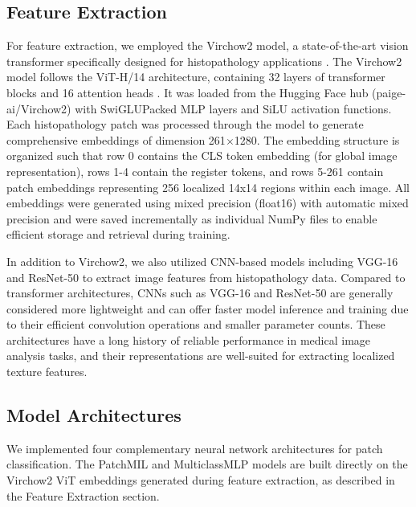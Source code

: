\documentclass[a4paper,12pt]{article}
\begin{document}
\subsection{Feature Extraction}
For feature extraction, we employed the Virchow2 model, a state-of-the-art vision transformer specifically designed for histopathology applications \cite{vorontsov_virchow_2024,zimmermann_virchow2_2024}. The Virchow2 model follows the ViT-H/14 architecture, containing 32 layers of transformer blocks and 16 attention heads \cite{dosovitskiy_image_2021}. It was loaded from the Hugging Face hub (paige-ai/Virchow2) with SwiGLUPacked MLP layers and SiLU activation functions. Each histopathology patch was processed through the model to generate comprehensive embeddings of dimension 261$\times$1280. The embedding structure is organized such that row 0 contains the CLS token embedding (for global image representation), rows 1-4 contain the register tokens, and rows 5-261 contain patch embeddings representing 256 localized 14x14 regions within each image. All embeddings were generated using mixed precision (float16) with automatic mixed precision and were saved incrementally as individual NumPy files to enable efficient storage and retrieval during training.

In addition to Virchow2, we also utilized CNN-based models including VGG-16 and ResNet-50 to extract image features from histopathology data. Compared to transformer architectures, CNNs such as VGG-16 and ResNet-50 are generally considered more lightweight and can offer faster model inference and training due to their efficient convolution operations and smaller parameter counts. These architectures have a long history of reliable performance in medical image analysis tasks, and their representations are well-suited for extracting localized texture features.

\subsection{Model Architectures}
We implemented four complementary neural network architectures for patch classification. The PatchMIL and MulticlassMLP models are built directly on the Virchow2 ViT embeddings generated during feature extraction, as described in the Feature Extraction section.
\end{document}
